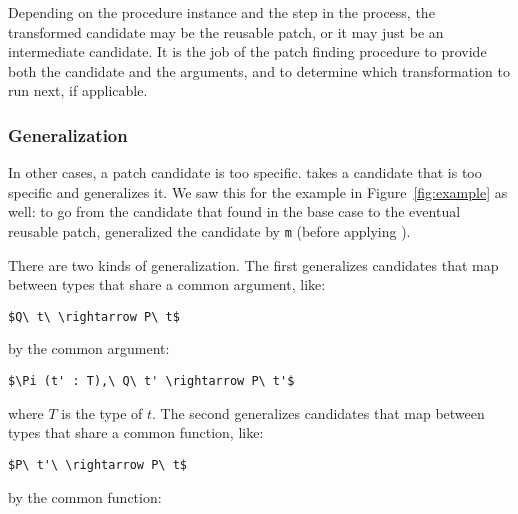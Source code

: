 Depending on the procedure instance and the step in the process, the transformed candidate may be the reusable patch,
or it may just be an intermediate candidate.
It is the job of the patch finding procedure to provide both the candidate and the arguments,
and to determine which transformation to run next, if applicable.

\iffalse
It works by combining application with reduction, with just one derivation:

\begin{mathpar}
\small
\hfill\fbox{$\Gamma$ $\vdash$ $(t,\ \vec{a},\ \Downarrow{r}) \Downarrow_{s} t'$ }\\

\inferrule[Specialize]
  { \Gamma \vdash t\ \vec{a} \Downarrow_{r} t'}
  { \Gamma \vdash (t,\ \vec{a},\ \Downarrow_{r}) \Downarrow_{s} t'}
\end{mathpar}
There is just one super weird thing I do not even know if I am allowed to do here:
the reduction strategy $\Downarrow_{r}$ is itself a transformation that reduces a term in an arbitrary way.
\fi

\subsubsection*{Generalization} In other cases, a patch candidate is too specific.
 takes a candidate that is too specific and generalizes it.
We saw this for the example in Figure~\ref{fig:example} as well:
to go from the candidate that \sysname found in the base case to the eventual reusable patch,
\sysname generalized the candidate by \lstinline{m} (before applying ).

There are two kinds of generalization.
The first generalizes candidates that map between types that share a common argument, like: %

\begin{lstlisting}[language=coq]
  $Q\ t\ \rightarrow P\ t$
\end{lstlisting}
by the common argument:

\begin{lstlisting}[language=coq]
  $\Pi (t' : T),\ Q\ t' \rightarrow P\ t'$
\end{lstlisting}
where $T$ is the type of $t$.
The second generalizes candidates that map between types that share a common function, like:

\begin{lstlisting}[language=coq]
  $P\ t'\ \rightarrow P\ t$
\end{lstlisting}
by the common function:

